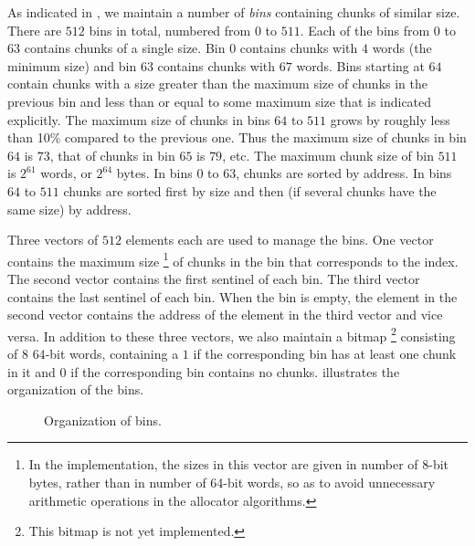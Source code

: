 As indicated in
, we maintain
a number of \emph{bins} containing chunks of similar size.  There are
$512$ bins in total, numbered from $0$ to $511$.  Each of the bins
from $0$ to $63$ contains chunks of a single size.  Bin $0$
contains chunks with $4$ words (the minimum size) and bin $63$
contains chunks with $67$ words.  Bins starting at $64$ contain chunks
with a size greater than the maximum size of chunks in the previous
bin and less than or equal to some maximum size that is indicated
explicitly.  The maximum size of chunks in bins $64$ to $511$ grows by
roughly less than 10\% compared to the previous one.  Thus the maximum
size of chunks in bin $64$ is $73$, that of chunks in bin $65$ is
$79$, etc.  The maximum chunk size of bin $511$ is $2^{61}$ words, or
$2^{64}$ bytes.  In bins $0$ to $63$, chunks are sorted by address.
In bins $64$ to $511$ chunks are sorted first by size and then (if
several chunks have the same size) by address.%

Three vectors of $512$ elements each are used to manage the bins.  One
vector contains the maximum size%
\footnote{In the implementation, the sizes in this vector are given in
  number of 8-bit bytes, rather than in number of 64-bit words, so as
  to avoid unnecessary arithmetic operations in the allocator
  algorithms.}  of chunks in the bin that corresponds to the index.
The second vector contains the first sentinel of each bin.  The third
vector contains the last sentinel of each bin.  When the bin is empty,
the element in the second vector contains the address of the element
in the third vector and vice versa.  In addition to these three
vectors, we also maintain a bitmap%
\footnote{This bitmap is not yet implemented.}  consisting of $8$
$64$-bit words, containing a $1$ if the corresponding bin has at least
one chunk in it and $0$ if the corresponding bin contains no chunks.
 illustrates the organization of the bins.

\begin{figure}
\begin{center}
\end{center}
\caption{\label{fig-bins}
Organization of bins.}
\end{figure}


